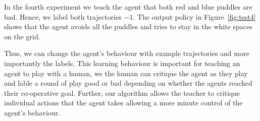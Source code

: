 In the fourth experiment we teach the agent that both red and blue
puddles are bad. Hence, we label both trajectories $-1$.  The output
policy in Figure~\ref{fig:test4} shows that the agent avoids all the
puddles and tries to stay in the white spaces on the grid.

Thus, we can change the agent's behaviour with example trajectories
and more importantly the labels. This learning behaviour is important
for teaching an agent to play with a human, we the human can critique
the agent as they play and lable a round of play good or bad depending
on whether the agents reached their co-operative goal. Further, our
algorithm allows the teacher to critique individual actions that the
agent takes allowing a more minute control of the agent's behaviour.
